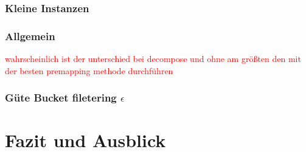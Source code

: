 \documentclass[11pt, a4paper, german]{article}
\begin{document}
\subsubsection{Kleine Instanzen}

\subsubsection{Allgemein}
\textcolor{red}{wahrscheinlich ist der unterschied bei decompose und ohne am größten den mit der besten premapping methode durchführen}

\subsubsection{Güte Bucket filetering $\epsilon$ }

\section{Fazit und Ausblick}
\label{sec:fazit_und_ausblick}
	

\newpage
{}
\nocite{*}
\renewcommand{\refname}{11 \,\, Literaturverzeichnis}



\end{document}
